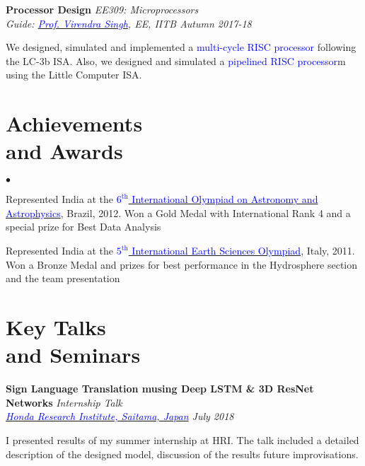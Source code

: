\documentclass[margin,line]{res}
\newenvironment{list1}{
  \begin{list}{\ding{113}}{%
      \setlength{\itemsep}{0in}
      \setlength{\parsep}{0in} \setlength{\parskip}{0in}
      \setlength{\topsep}{0in} \setlength{\partopsep}{0in} 
      \setlength{\leftmargin}{0.17in}}}{\end{list}}
\newenvironment{list2}{
  \begin{list}{$\bullet$}{%
      \setlength{\itemsep}{0in}
      \setlength{\parsep}{0in} \setlength{\parskip}{0in}
      \setlength{\topsep}{0in} \setlength{\partopsep}{0in} 
      \setlength{\leftmargin}{0.2in}}}{\end{list}}
\begin{document}
\begin{resume}
{\bf Processor Design} \hfill \textit{EE309: Microprocessors} \\
{\em Guide: \href{https://www.ee.iitb.ac.in/~viren/}{\textcolor{blue}{Prof. Virendra Singh}}, EE, IITB \hfill Autumn 2017-18} \\
\vspace*{-.15in}
\begin{list1}
\item[] We designed, simulated and implemented a {\textcolor{blue} {multi-cycle RISC processor}} following the LC-3b ISA. Also, we designed and simulated a {\textcolor{blue} {pipelined RISC processor}}m using the Little Computer ISA.
\end{list1}



\section{\sc Achievements \\ and Awards}
\begin{list2}
\item Represented India at the \href{http://www.ioaa2012.ufrj.br/}{\textcolor{blue} {$6^\text{th}$ International Olympiad on Astronomy and Astrophysics}}, Brazil, 2012. Won a Gold Medal with International Rank 4 and a special prize for Best Data Analysis
\item Represented India at the \href{http://www.ieso2011.unimore.it/}{\textcolor{blue} {$5^\text{th}$ International Earth Sciences Olympiad}}, Italy, 2011. Won a Bronze Medal and prizes for best performance in the Hydrosphere section and the team presentation
\end{list2}

\section{\sc Key Talks \\ and Seminars}

{\bf Sign Language Translation musing Deep LSTM \& 3D ResNet Networks} \hfill {\em Internship Talk} \\
{\em \href{http://www.jp.honda-ri.com/en/}{\textcolor{blue}{Honda Research Institute, Saitama, Japan}} \hfill July 2018} \\
\vspace*{-.15in}
\begin{list1}
\item[] I presented results of my summer internship at HRI. The talk included a detailed description of the designed model, discussion of the results future improvisations. 
\end{list1}


\end{resume}
\end{document}

